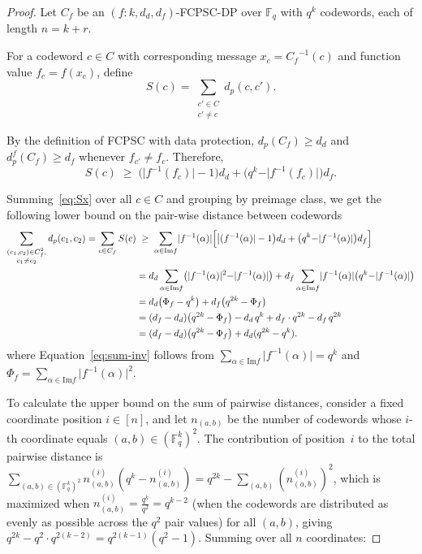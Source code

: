\documentclass[10pt,a4paper]{amsart}
\newcommand{\Img}{\mathrm{Im}}
\begin{document}
    \begin{proof}
    Let ${C_f}$ be an $(f: k,d_d,d_f)$-FCPSC-DP over $\mathbb{F}_q$ with $q^k$ codewords, each of length $n = k + r$.
    
    For a codeword $c\in C$ with corresponding message $x_c = {C_f}^{-1}(c)$ and function value $f_c = f(x_c)$, define
    \[
         S(c) = \sum_{\substack{c'\in C\\c'\neq c}} d_p(c,c').
    \]
    
    By the definition of FCPSC with data protection, $d_p(C_f)\geq d_d$  and  $d_p^f(C_f)\geq d_f$ whenever $f_{c'} \neq f_c$.  Therefore,
    \begin{equation}\label{eq:Sx}
     S(c)
    \;\geq \;
     \bigl(\rvert f^{-1}{(f_c)}\rvert - 1\bigr)d_d
    + \bigl(q^k - \rvert f^{-1}({f_c})\rvert\bigr)d_f.
    \end{equation}

    \noindent
    Summing~\eqref{eq:Sx} over all $c\in C$ and grouping by preimage class, we get the following lower bound on the pair-wise distance between codewords 
    \begin{align}
    \sum_{\substack{(c_1,c_2)\in C_f^2,\\c_1\neq c_2}}d_p(c_1,c_2) = \sum_{c\in C_f} S(c)
    &\;\geq \; \sum_{\alpha\in\Img{f}} \rvert f^{-1}({\alpha})\rvert \Bigl[\bigl\rvert(f^{-1}({\alpha})\rvert-1\bigr)d_d
        + \bigl(q^k - \rvert f^{-1}({\alpha})\rvert\bigr)d_f\Bigr]
    \notag\\
    &= d_d\sum_{\alpha\in\Img{f}}\bigl(\rvert f^{-1}({\alpha})\rvert^2 - \rvert f^{-1}({\alpha})\rvert\bigr)
    + d_f\sum_{\alpha\in\Img{f}}\rvert f^{-1}({\alpha})\rvert\bigl(q^k - \rvert f^{-1}({\alpha})\rvert\bigr)
    \notag\\
    &= d_d\bigl(\Phi_f - q^k\bigr)
    + d_f\bigl(q^{2k} - \Phi_f\bigr)\label{eq:sum-inv}
    \\
    &= (d_f-d_d)\bigl(q^{2k}-\Phi_f\bigr) - d_d\,q^k + d_f\cdot q^{2k} - d_f\,q^{2k}
    \notag\\
    &= (d_f-d_d)\bigl(q^{2k}-\Phi_f\bigr) + d_d(q^{2k}-q^k).
    \label{eq:lower}
    \end{align}
    where Equation~\ref{eq:sum-inv} follows from $\sum_{\alpha\in\Img{f}}\rvert f^{-1}({\alpha})\rvert = q^k$ and $\Phi_f = \sum_{\alpha\in\Img{f}} \rvert f^{-1}({\alpha})\rvert^2$.

 
    \medskip
    \noindent
    To calculate the upper bound on the sum of pairwise distances, consider a fixed coordinate position $i\in[n]$, and let $n_{ (a,b)}$ be the number of
    codewords whose $i$-th coordinate equals $(a,b)\in(\mathbb{F}_q^k)^2$.  The contribution of position~$i$ to the total pairwise distance is
    $\sum_{(a,b)\in(\mathbb{F}_q^k)^2} n_{(a,b)}^{(i)}(q^{k} - n_{(a,b)}^{(i)}) = q^{2k} - \sum_{(a,b)} (n_{(a,b)}^{(i)})^2$, which is maximized when $n_{(a,b)}^{(i)} = \frac{q^k}{q^2} = q^{k-2}$ (when the codewords are distributed as evenly as possible across the $q^2$
    pair values) for all $(a,b)$, giving $q^{2k} - q^2\cdot q^{2(k-2)} = q^{2(k-1)}(q^2-1)$.
    Summing over all $n$ coordinates:


\end{proof}
\end{document}
